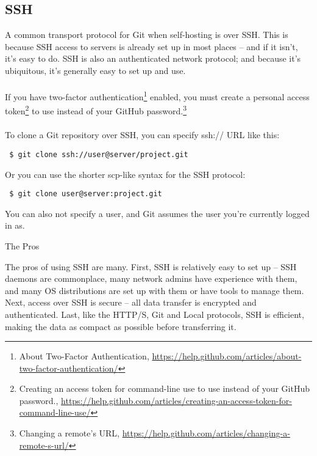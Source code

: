 

\newpage
\subsection{SSH}
A common transport protocol for Git when self-hosting is over SSH.
This is because SSH access to servers is already set up in most
places – and if it isn’t, it's easy to do.  SSH is also an
authenticated network protocol; and because it’s ubiquitous,
it's generally easy to set up and use.
\\
\\
If you have two-factor authentication\footnote{About Two-Factor Authentication,
\href{https://help.github.com/articles/about-two-factor-authentication/}{https://help.github.com/articles/about-two-factor-authentication/}}
enabled, you must create a personal access token\footnote{Creating
an access token for command-line use to use instead of your GitHub password.,
\href{https://help.github.com/articles/creating-an-access-token-for-command-line-use/}{https://help.github.com/articles/creating-an-access-token-for-command-line-use/}}
 to use instead of your GitHub password.\footnote{Changing a remote's URL,
 \href{https://help.github.com/articles/changing-a-remote-s-url/}{https://help.github.com/articles/changing-a-remote-s-url/}}
\\
\\
To clone a Git repository over SSH, you can specify ssh:// URL like this:

\begin{Verbatim}
 $ git clone ssh://user@server/project.git
\end{Verbatim}

\noindent Or you can use the shorter scp-like syntax for the SSH
protocol:

\begin{Verbatim}
 $ git clone user@server:project.git
\end{Verbatim}

\noindent You can also not specify a user, and Git assumes the
user you’re currently logged in as.


\vspace{20pt}
\noindent\begin{bf}The Pros\end{bf}
The pros of using SSH are many.  First, SSH is relatively easy
to set up – SSH daemons are commonplace, many network admins have
experience with them, and many OS distributions are set up with
them or have tools to manage them.  Next, access over SSH is
secure – all data transfer is encrypted and authenticated.  Last,
like the HTTP/S, Git and Local protocols, SSH is efficient, making
the data as compact as possible before transferring it.


